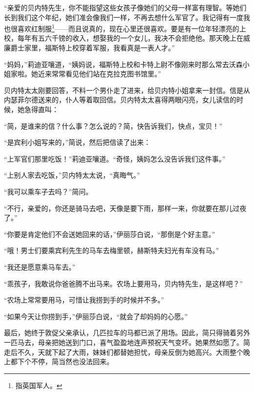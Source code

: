 \par “亲爱的贝内特先生，你不能指望这些女孩子像她们的父母一样富有理智。等她们长到我们这个年纪，她们准会像我们一样，不再去想什么军官了。我记得有一度我也很喜欢红制服\footnote{指英国军人。}——而且说真的，现在心里还很喜欢。要是有一位年轻漂亮的上校，每年有五六千镑的收入，想娶我的一个女儿，我决不会拒绝他。那天晚上在威廉爵士家里，福斯特上校穿着军服，我看真是一表人才。”
\par “妈妈，”莉迪亚嚷道，“姨妈说，福斯特上校和卡特上尉不像刚来时那么常去沃森小姐家啦。她近来常常看见他们站在克拉克图书馆里。”
\par 贝内特太太刚要回答，不料一个男仆走了进来，给贝内特小姐拿来一封信。信是从内瑟菲尔德送来的，仆人等着取回信。贝内特太太喜得两眼闪亮，女儿读信的时候，她急得直叫：
\par “简，是谁来的信？什么事？怎么说的？简，快告诉我们，快点，宝贝！”
\par “是宾利小姐写来的，”简说，然后把信读了出来：
\par “上军官们那里吃饭！”莉迪亚嚷道。“奇怪，姨妈怎么没告诉我们这件事。”
\par “上别人家去吃饭，”贝内特太太说，“真晦气。”
\par “我可以乘车子去吗？”简问。
\par “不行，亲爱的，你还是骑马去吧，天像是要下雨，那样一来，你就要在那儿过夜了。”
\par “你要是肯定他们不会送她回来的话，”伊丽莎白说，“那倒是个好主意。”
\par “哦！男士们要乘宾利先生的马车去梅里顿，赫斯特夫妇光有车没有马。”
\par “我还是愿意乘马车去。”
\par “乖孩子，我敢说你爸爸腾不出马来。农场上要用马，贝内特先生，是这样吧？”
\par “农场上常常要用马，可惜让我捞到手的时候并不多。”
\par “如果今天让你捞到手，”伊丽莎白说，“就会了却妈妈的心愿。”
\par 最后，她终于敦促父亲承认，几匹拉车的马都已派了用场。因此，简只得骑着另外一匹马去，母亲把她送到门口，喜气盈盈地连声预祝天气变坏。她果然如愿了。简走后不久，天就下起了大雨，妹妹们都替她担忧，母亲反倒为她高兴。大雨整个晚上都下个不停，简当然也没法回来。
